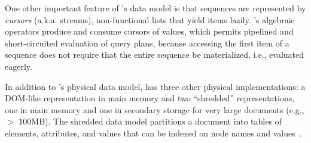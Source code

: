 One other important feature of \Galax{}'s data model is that sequences
are represented by \emph{cursors} (a.k.a. streams), non-functional
lists that yield items lazily.  \Galax{}'s algebraic operators produce
and consume cursors of values, which permits pipelined and
short-circuited evaluation of query plans, because accessing the first
item of a sequence does not require that the entire sequence be
materialized, i.e., evaluated eagerly.

In addition to \padx{}'s physical data model, \Galax{} has three other
physical implementations: a DOM-like representation in main memory and
two ``shredded'' representations, one in main memory and one in
secondary storage for very large documents (e.g., $>$ 100MB).  The
shredded data model partitions a document into tables of elements,
attributes, and values that can be indexed on node names and
values~\cite{galax:ximep2004}.


